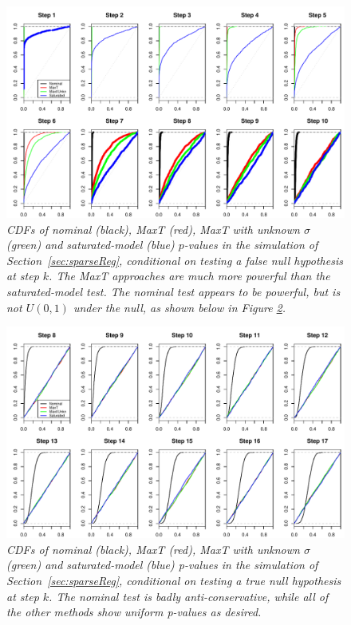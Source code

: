 \documentclass{article}
\begin{document}
\begin{figure}[h]
  \centering
  \includegraphics[width=1\textwidth]{figs/simulation_snr_5_alpha_05_null_false.pdf}
  \caption{\em  CDFs of nominal (black), MaxT (red), MaxT with unknown $\sigma$ (green) and  saturated-model (blue) $p$-values in the simulation of Section~\ref{sec:sparseReg}, conditional on testing a false null hypothesis at step $k$. The MaxT approaches are much more powerful than the saturated-model test. The nominal test appears to be powerful, 
  but is not $U(0,1)$ under the null, as shown below in Figure \ref{fig:simulation_null_true}.}
  \label{fig:simulation_null_false}
\end{figure}

\begin{figure}[h]
  \centering
  \includegraphics[width=1\textwidth]{figs/simulation_snr_5_alpha_05_null_true.pdf}
  \caption{\em  CDFs of nominal (black), MaxT (red), MaxT with unknown $\sigma$ (green) and  saturated-model (blue) p-values in the simulation of Section~\ref{sec:sparseReg}, conditional on testing a true null hypothesis at step $k$.  The nominal test is badly anti-conservative, while all of the other methods  show uniform p-values as desired.}
  \label{fig:simulation_null_true}
\end{figure}
\end{document}
